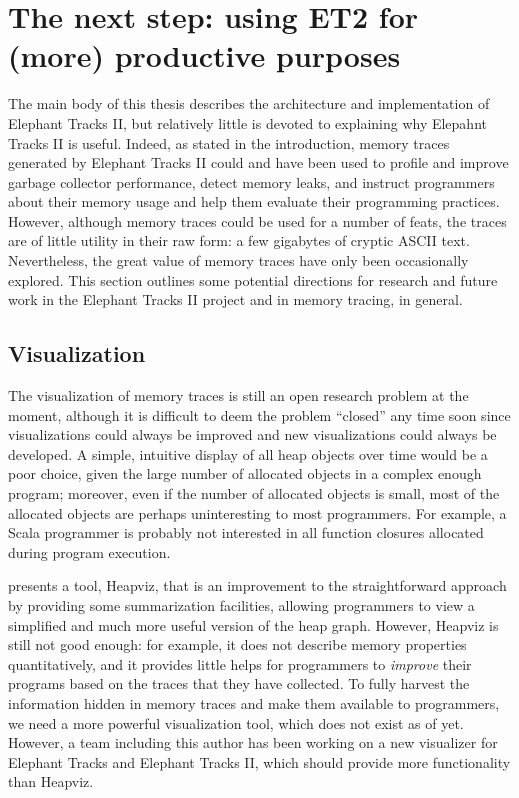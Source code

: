 \section{The next step: using ET2 for (more) productive purposes}
The main body of this thesis describes the architecture and implementation of Elephant Tracks II, but relatively little is devoted to
explaining why Elepahnt Tracks II is useful. Indeed, as stated in the introduction, memory traces generated by Elephant Tracks II could
and have been used to profile and improve garbage collector performance, detect memory leaks, and instruct programmers about their memory
usage and help them evaluate their programming practices. However, although memory traces could be used for a number of feats, the traces
are of little utility in their raw form: a few gigabytes of cryptic ASCII text. Nevertheless, the great value of memory traces have only been
occasionally explored. This section outlines some potential directions for research and future work in the Elephant Tracks II project and in
memory tracing, in general.

\subsection{Visualization}
The visualization of memory traces is still an open research problem at the moment, although it is difficult to deem the problem ``closed''
any time soon since visualizations could always be improved and new visualizations could always be developed. A simple, intuitive display of
all heap objects over time would be a poor choice, given the large number of allocated objects in a complex enough program; moreover, even if
the number of allocated objects is small, most of the allocated objects are perhaps uninteresting to most programmers. For example, a Scala
programmer is probably not interested in all function closures allocated during program execution.

\cite{Heapviz} presents a tool, Heapviz, that is an improvement to the straightforward approach by providing some summarization facilities,
allowing programmers to view a simplified and much more useful version of the heap graph. However, Heapviz is still not good enough: for example,
it does not describe memory properties quantitatively, and it provides little helps for programmers to \emph{improve} their programs based on
the traces that they have collected. To fully harvest the information hidden in memory traces and make them available to programmers, we need a
more powerful visualization tool, which does not exist as of yet. However, a team including this author has been working on a new visualizer for
Elephant Tracks and Elephant Tracks II, which should provide more functionality than Heapviz.

